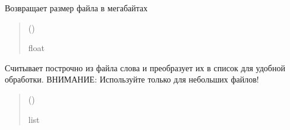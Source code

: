 \documentclass[a4paper,11pt,russian,openany,oneside]{sphinxmanual}
\begin{document}
\begin{savenotes}\begin{fulllineitems}
\label{\detokenize{_autosummary/scan_module.read_files:scan_module.read_files.get_file_size_mb}}
\pysigstartsignatures
\pysiglinewithargsret
{}
{}
{}
\pysigstopsignatures
\sphinxAtStartPar
Возвращает размер файла в мегабайтах
\begin{quote}\begin{description}
\sphinxAtStartPar
{} ()

\sphinxAtStartPar
float

\end{description}\end{quote}

\end{fulllineitems}\end{savenotes}


\begin{savenotes}\begin{fulllineitems}
\label{\detokenize{_autosummary/scan_module.read_files:scan_module.read_files.get_words_from_file}}
\pysigstartsignatures
\pysiglinewithargsret
{}
{}
{}
\pysigstopsignatures
\sphinxAtStartPar
Считывает построчно из файла слова и преобразует
их в список для удобной обработки.
ВНИМАНИЕ: Используйте только для небольших файлов!
\begin{quote}\begin{description}
\sphinxAtStartPar
{} ()

\sphinxAtStartPar
list

\end{description}\end{quote}

\end{fulllineitems}\end{savenotes}
\end{document}
